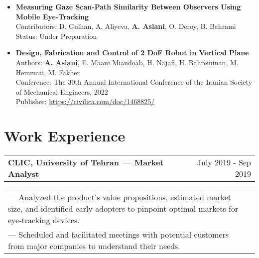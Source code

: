 \documentclass[a4paper,10pt]{article}
\begin{document}
\begin{itemize}
    \item \textbf{Measuring Gaze Scan-Path Similarity Between Observers Using Mobile Eye-Tracking}\\
    Contributors: D. Gulhan, A. Aliyeva, \textbf{A. Aslani}, O. Deroy, B. Bahrami\\
    Status: Under Preparation
\end{itemize}


\begin{itemize}
    \item \textbf{Design, Fabrication and Control of 2 DoF Robot in Vertical Plane}\\
    Authors: \textbf{A. Aslani}, E. Maani Miandoab, H. Najafi, H. Bahreininan, M. Hemmati, M. Fakher\\
    Conference: The 30th Annual International Conference of the Iranian Society of Mechanical Engineers, 2022\\
    Publisher:  \href{https://civilica.com/doc/1468825/}{https://civilica.com/doc/1468825/}
\end{itemize}





\section{Work Experience}

\begin{tabularx}{\linewidth}{@{}X r@{}}
    \textbf{CLIC, University of Tehran — Market Analyst} & \hfill July 2019 - Sep 2019 \\[3.75pt]
\end{tabularx}

\begin{tabularx}{\linewidth}{@{}X r@{}}
    {— Analyzed the product's value propositions, estimated market size, and identified early adopters to pinpoint optimal markets for eye-tracking devices.}\\
    {— Scheduled and facilitated meetings with potential customers from major companies to understand their needs.}\\
\end{tabularx}
\end{document}
